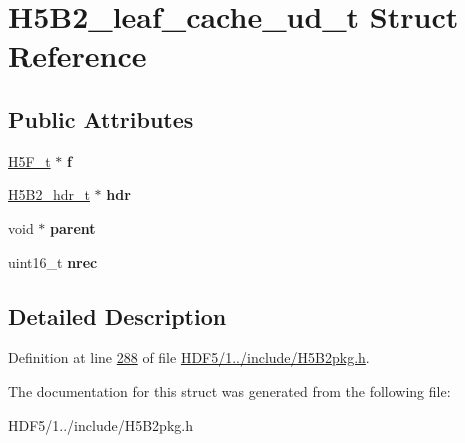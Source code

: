 \hypertarget{struct_h5_b2__leaf__cache__ud__t}{}\section{H5\+B2\+\_\+leaf\+\_\+cache\+\_\+ud\+\_\+t Struct Reference}
\label{struct_h5_b2__leaf__cache__ud__t}
\subsection*{Public Attributes}
\begin{DoxyCompactItemize}
\item 
\mbox{\label{struct_h5_b2__leaf__cache__ud__t_a20408217a65760fbda64a350fd49e07f}} 
\hyperlink{struct_h5_f__t}{H5\+F\+\_\+t} $\ast$ {\bfseries f}
\item 
\mbox{\label{struct_h5_b2__leaf__cache__ud__t_a4f319a5742e11276c4a61b11ef956c8e}} 
\hyperlink{struct_h5_b2__hdr__t}{H5\+B2\+\_\+hdr\+\_\+t} $\ast$ {\bfseries hdr}
\item 
\mbox{\label{struct_h5_b2__leaf__cache__ud__t_ada82cf72d40ac874a09edfd4e045f468}} 
void $\ast$ {\bfseries parent}
\item 
\mbox{\label{struct_h5_b2__leaf__cache__ud__t_a7f180fe23ee63dcbb378838a4c108fe7}} 
uint16\+\_\+t {\bfseries nrec}
\end{DoxyCompactItemize}


\subsection{Detailed Description}


Definition at line \hyperlink{_h_d_f5_21_810_81_2include_2_h5_b2pkg_8h_source_l00288}{288} of file \hyperlink{_h_d_f5_21_810_81_2include_2_h5_b2pkg_8h_source}{H\+D\+F5/1../include/\+H5\+B2pkg.\+h}.



The documentation for this struct was generated from the following file\+:\begin{DoxyCompactItemize}
\item 
H\+D\+F5/1../include/\+H5\+B2pkg.\+h\end{DoxyCompactItemize}
